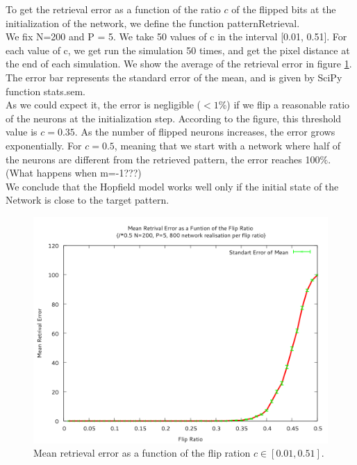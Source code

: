 To get the retrieval error as a function of the ratio $c$ of the flipped bits at the initialization of the network, we define the function patternRetrieval. \\
We fix N=200 and P = 5. We take 50 values of c in the interval [0.01, 0.51]. For each value of c, we get run the simulation 50 times, and get the pixel distance at the end of each simulation. We show the average of the retrieval error in figure \ref{reterr}. The error bar represents the standard error of the mean, and is given by SciPy function stats.sem. \\
As we could expect it, the error is negligible ($<1\%$) if we flip a reasonable ratio of the neurons at the initialization step. According to the figure, this threshold value is $c = 0.35$. As the number of flipped neurons increases, the error grows exponentially. For $c=0.5$, meaning that we start with a network where half of the neurons are different from the retrieved pattern, the error reaches 100$\%$. \\
(What happens when m=-1???)\\
We conclude that the Hopfield model works well only if the initial state of the Network is close to the target pattern.
\begin{center}
    \begin{figure}\label{reterr}
    \caption{Mean retrieval error as a function of the flip ration $c\in[0.01, 0.51]$.  }
    \includegraphics[scale=0.7]{img/ex11.png}
    \end{figure}
\end{center}

